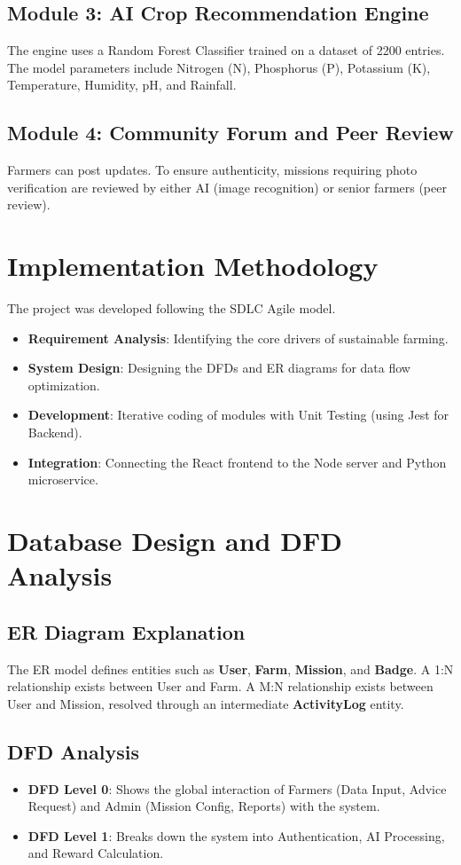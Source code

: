 \documentclass[journal]{IEEEtran}
\begin{document}
\subsection{Module 3: AI Crop Recommendation Engine}
The engine uses a Random Forest Classifier trained on a dataset of 2200 entries. The model parameters include Nitrogen (N), Phosphorus (P), Potassium (K), Temperature, Humidity, pH, and Rainfall.

\subsection{Module 4: Community Forum and Peer Review}
Farmers can post updates. To ensure authenticity, missions requiring photo verification are reviewed by either AI (image recognition) or senior farmers (peer review).

\section{Implementation Methodology}
The project was developed following the SDLC Agile model. 
\begin{itemize}
    \item \textbf{Requirement Analysis}: Identifying the core drivers of sustainable farming.
    \item \textbf{System Design}: Designing the DFDs and ER diagrams for data flow optimization.
    \item \textbf{Development}: Iterative coding of modules with Unit Testing (using Jest for Backend).
    \item \textbf{Integration}: Connecting the React frontend to the Node server and Python microservice.
\end{itemize}

\section{Database Design and DFD Analysis}
\subsection{ER Diagram Explanation}
The ER model defines entities such as \textbf{User}, \textbf{Farm}, \textbf{Mission}, and \textbf{Badge}. A 1:N relationship exists between User and Farm. A M:N relationship exists between User and Mission, resolved through an intermediate \textbf{ActivityLog} entity.

\subsection{DFD Analysis}
\begin{itemize}
    \item \textbf{DFD Level 0}: Shows the global interaction of Farmers (Data Input, Advice Request) and Admin (Mission Config, Reports) with the system.
    \item \textbf{DFD Level 1}: Breaks down the system into Authentication, AI Processing, and Reward Calculation.
\end{itemize}
\end{document}
